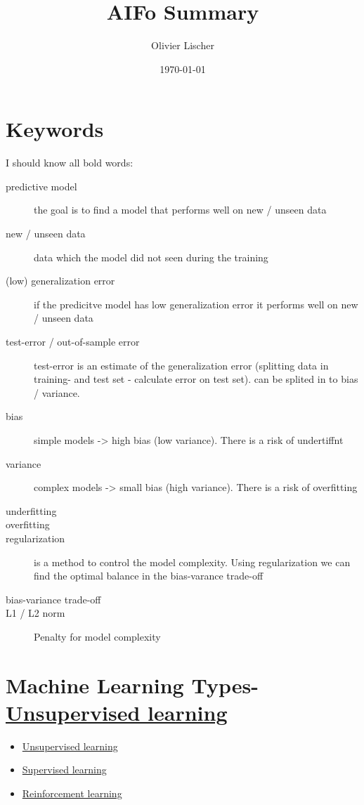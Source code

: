 \documentclass[11pt,twoside,landscape]{article}
\author{Olivier Lischer}
\date{\today}
\title{AIFo Summary}
\begin{document}
\begin{multicols}{3}

\section{Keywords}
\label{sec:org679bf26}
I should know all bold words:

\begin{description}
\item[{predictive model}] the goal is to find a model that performs well on new / unseen data
\item[{new / unseen data}] data which the model did not seen during the training
\item[{(low) generalization error}] if the predicitve model has low generalization error it performs well on new / unseen data
\item[{test-error / out-of-sample error}] test-error is an estimate of the generalization error (splitting data in training- and test set - calculate error on test set). can be splited in to bias / variance.
\item[{bias}] simple models -> high bias (low variance). There is a risk of undertiffnt
\item[{variance}] complex models -> small bias (high variance). There is a risk of overfitting
\item[{underfitting}] 

\item[{overfitting}] 

\item[{regularization}] is a method to control the model complexity. Using regularization we can find the optimal balance in the bias-varance trade-off
\item[{bias-variance trade-off}] 

\item[{L1 / L2 norm}] Penalty for model complexity
\end{description}

\section{Machine Learning Types- \href{../../../roam/20210924090800-unsupervised_learning.org}{Unsupervised learning}}
\label{sec:orged7bab9}
\begin{itemize}
\item \href{../../../roam/20210924090800-unsupervised_learning.org}{Unsupervised learning}
\item \href{../../../roam/20210924091334-supervised_learning.org}{Supervised learning}
\item \href{../../../roam/20210924091935-reinforcement_learning.org}{Reinforcement learning}
\end{itemize}


\end{multicols}
\end{document}
